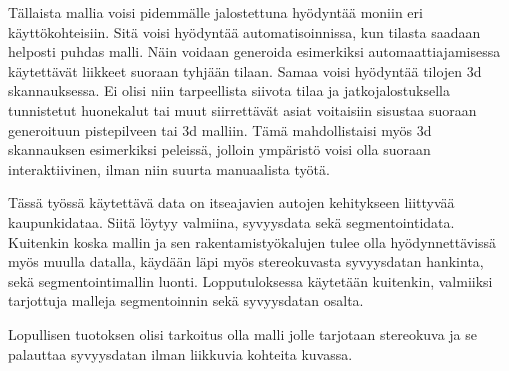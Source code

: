 Tällaista mallia voisi pidemmälle jalostettuna hyödyntää moniin eri käyttökohteisiin. Sitä voisi hyödyntää automatisoinnissa, kun tilasta saadaan helposti puhdas malli. Näin voidaan generoida esimerkiksi automaattiajamisessa käytettävät liikkeet suoraan tyhjään tilaan. Samaa voisi hyödyntää tilojen 3d skannauksessa. Ei olisi niin tarpeellista siivota tilaa ja jatkojalostuksella tunnistetut huonekalut tai muut siirrettävät asiat voitaisiin sisustaa suoraan generoituun pistepilveen tai 3d malliin. Tämä mahdollistaisi myös 3d skannauksen esimerkiksi peleissä, jolloin ympäristö voisi olla suoraan interaktiivinen, ilman niin suurta manuaalista työtä. 

Tässä työssä käytettävä data on itseajavien autojen kehitykseen liittyvää kaupunkidataa. Siitä löytyy valmiina, syvyysdata sekä segmentointidata. Kuitenkin koska mallin ja sen rakentamistyökalujen tulee olla hyödynnettävissä myös muulla datalla, käydään läpi myös stereokuvasta syvyysdatan hankinta, sekä segmentointimallin luonti. Lopputuloksessa käytetään kuitenkin, valmiiksi tarjottuja malleja segmentoinnin sekä syvyysdatan osalta.

Lopullisen tuotoksen olisi tarkoitus olla malli jolle tarjotaan stereokuva ja se palauttaa syvyysdatan ilman liikkuvia kohteita kuvassa.